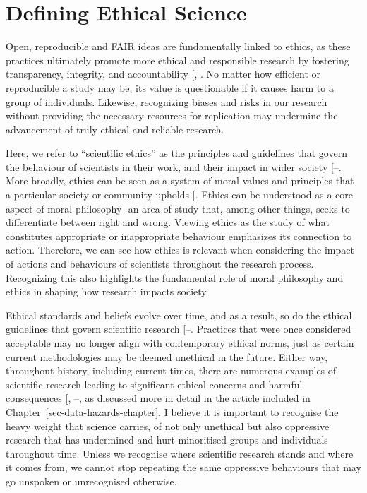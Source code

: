 \documentclass[
  11pt,
  letterpaper,
]{scrreprt}
\begin{document}
\section{Defining Ethical Science}\label{defining-ethical-science}

Open, reproducible and FAIR ideas are fundamentally linked to ethics, as
these practices ultimately promote more ethical and responsible research
by fostering transparency, integrity, and accountability
{[},
\citeproc{ref-kushwaha2024Ethical}{407}{]}. No matter how efficient or
reproducible a study may be, its value is questionable if it causes harm
to a group of individuals. Likewise, recognizing biases and risks in our
research without providing the necessary resources for replication may
undermine the advancement of truly ethical and reliable research.

Here, we refer to ``scientific ethics'' as the principles and guidelines
that govern the behaviour of scientists in their work, and their impact
in wider society
{[}--\citeproc{ref-menapace2019Scientific}{410}{]}.
More broadly, ethics can be seen as a system of moral values and
principles that a particular society or community upholds
{[}\citeproc{ref-gensler2017Ethics}{411}{]}. Ethics can be understood as
a core aspect of moral philosophy -an area of study that, among other
things, seeks to differentiate between right and wrong. Viewing ethics
as the study of what constitutes appropriate or inappropriate behaviour
emphasizes its connection to action. Therefore, we can see how ethics is
relevant when considering the impact of actions and behaviours of
scientists throughout the research process. Recognizing this also
highlights the fundamental role of moral philosophy and ethics in
shaping how research impacts society.

Ethical standards and beliefs evolve over time, and as a result, so do
the ethical guidelines that govern scientific research
{[}--\citeproc{ref-macklin2008Standard}{414}{]}.
Practices that were once considered acceptable may no longer align with
contemporary ethical norms, just as certain current methodologies may be
deemed unethical in the future. Either way, throughout history,
including current times, there are numerous examples of scientific
research leading to significant ethical concerns and harmful
consequences {[},
--\citeproc{ref-birhane2020Decolonising}{417}{]},
as discussed more in detail in the article included in
Chapter~\ref{sec-data-hazards-chapter}. I believe it is important to
recognise the heavy weight that science carries, of not only unethical
but also oppressive research that has undermined and hurt minoritised
groups and individuals throughout time. Unless we recognise where
scientific research stands and where it comes from, we cannot stop
repeating the same oppressive behaviours that may go unspoken or
unrecognised otherwise.
\end{document}

